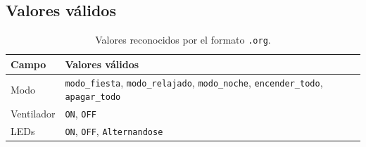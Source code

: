 \documentclass[12pt,a4paper]{article}
\begin{document}
\subsection{Valores válidos}
\begin{table}[H]
    \centering
    \caption{Valores reconocidos por el formato \texttt{.org}.}
    \begin{tabular}{p{4cm}p{8cm}}
        \toprule
        \textbf{Campo} & \textbf{Valores válidos} \\
        \midrule
        Modo & \texttt{modo\_fiesta}, \texttt{modo\_relajado}, \texttt{modo\_noche}, \texttt{encender\_todo}, \texttt{apagar\_todo} \\
        Ventilador & \texttt{ON}, \texttt{OFF} \\
        LEDs & \texttt{ON}, \texttt{OFF}, \texttt{Alternandose} \\
        \bottomrule
    \end{tabular}
\end{table}
\end{document}
